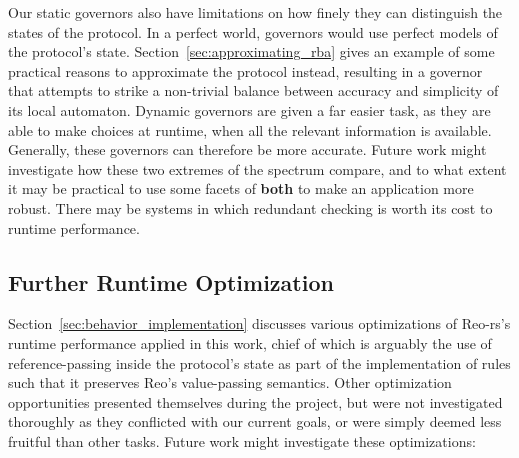 Our static governors also have limitations on how finely they can distinguish the states of the protocol. In a perfect world, governors would use perfect models of the protocol's state. Section~\ref{sec:approximating_rba} gives an example of some practical reasons to approximate the protocol instead, resulting in a governor that attempts to strike a non-trivial balance between accuracy and simplicity of its local automaton. Dynamic governors are given a far easier task, as they are able to make choices at runtime, when all the relevant information is available. Generally, these governors can therefore be more accurate. Future work might investigate how these two extremes of the spectrum compare, and to what extent it may be practical to use some facets of \textbf{both} to make an application more robust. There may be systems in which redundant checking is worth its cost to runtime performance.

\subsection{Further Runtime Optimization}
Section~\ref{sec:behavior_implementation} discusses various optimizations of Reo-rs's runtime performance applied in this work, chief of which is arguably the use of reference-passing inside the protocol's state as part of the implementation of rules such that it preserves Reo's value-passing semantics. Other optimization opportunities presented themselves during the project, but were not investigated thoroughly as they conflicted with our current goals, or were simply deemed less fruitful than other tasks. Future work might investigate these optimizations:

